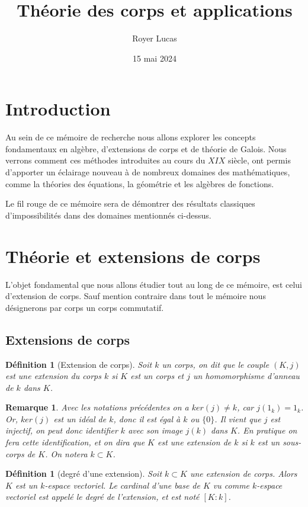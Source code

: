 \documentclass[12pt,a4paper]{report}
\newtheorem{defn}[thm]{\bf D\'efinition}
\newtheorem{rem}[thm]{Remarque}
\begin{document}
\author{Royer Lucas}
\title{Théorie des corps et applications}
\date{15 mai 2024}
\maketitle
\tableofcontents
\newpage
\hypersetup{hidelinks}
\section{Introduction}
Au sein de ce mémoire de recherche nous allons explorer les concepts fondamentaux en algèbre, d'extensions de corps et de théorie de Galois. Nous verrons comment ces méthodes introduites au cours du $XIX$ siècle, ont permis d'apporter un éclairage nouveau à de nombreux domaines des mathématiques, comme la théories des équations, la géométrie et les algèbres de fonctions. 

Le fil rouge de ce mémoire sera de démontrer des résultats classiques d'impossibilités dans des domaines mentionnés ci-dessus. 

\section{Théorie et extensions de corps}
L'objet fondamental que nous allons étudier tout au long de ce mémoire, est celui d'extension de corps. Sauf mention contraire dans tout le mémoire nous désignerons par corps un corps commutatif.

\subsection{Extensions de corps}
\begin{defn}[Extension de corps]\rm Soit $k$ un corps, on dit que le couple $(K,j)$ est une extension du corps $k$ si $K$ est un corps et $j$ un homomorphisme d'anneau de $k$ dans $K$. 
\end{defn}

\begin{rem} \rm Avec les notations précédentes on a $ker(j)\neq k$, car $j(1_{k})=1_{k}$. Or, $ker(j)$ est un idéal de $k$, donc il est égal à $k$ ou $\{0\}$. Il vient que $j$ est injectif, on peut donc identifier $k$ avec son image $j(k)$ dans $K$. En pratique on fera cette identification, et on dira que $K$ est une extension de $k$ si $k$ est un sous-corps de $K$. On notera $k\subset K$. 

\end{rem}

\begin{defn}[degré d'une extension]\rm
Soit $k\subset K$ une extension de corps. Alors $K$ est un $k$-espace vectoriel. Le cardinal d'une base de $K$ vu comme $k$-espace vectoriel est appelé le degré de l'extension, et est noté $[K:k]$.

\end{defn}
\end{document}
